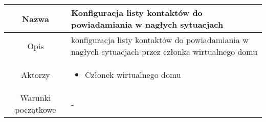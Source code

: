 \documentclass{article}
\begin{document}
\begin{enumerate}
\begin{enumerate}
				\begin{table}[H]
					\centering
					\begin{tabular}{|c|p{7cm}|}
						\hline
						Nazwa                   & Konfiguracja listy kontaktów do powiadamiania w nagłych sytuacjach                                                                                                                                                                                                                                                                                                                                                                                                                                                                                       \\
						\hline
						Opis                    & konfiguracja listy kontaktów do powiadamiania w nagłych sytuacjach przez członka wirtualnego domu                                                                                                                                                                                                                                                                                                                                                                                                                                                        \\
						\hline
						Aktorzy                 & \begin{itemize}\item Członek wirtualnego domu\end{itemize}                                                                                                                                                                                                                                                                                                                                                                                                                                                                                               \\
						\hline
						Warunki początkowe      & -                                                                                                                                                                                                                                                                                                                                                                                                                                                                                                                                                        \\

\end{tabular}
\end{table}
\end{enumerate}
\end{enumerate}
\end{document}
